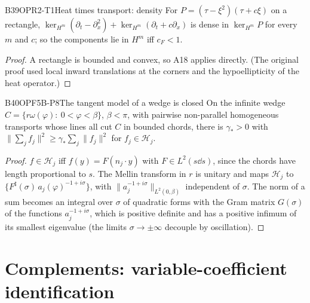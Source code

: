 \begin{dimcard}{B39}{OPR2-T1}{Heat times transport: density}{\pw}{}
For $P=(\tau-\xi^2)(\tau+c\xi)$ on a rectangle, $\ker_{H^m}(\partial_t-\partial_x^2)+\ker_{H^m}(\partial_t+c\partial_x)$ is dense in $\ker_{H^m}P$ for every $m$ and $c$; so the components lie in $H^m$ iff $c_F<1$.
\end{dimcard}
\begin{proof}
A rectangle is bounded and convex, so A18 applies directly. (The original proof used local inward translations at the corners and the hypoellipticity of the heat operator.)
\end{proof}

\begin{dimcard}{B40}{OPF5B-P8}{The tangent model of a wedge is closed}{\pw}{}
On the infinite wedge $C=\{r\omega(\varphi):\ 0<\varphi<\beta\}$, $\beta<\pi$, with pairwise non-parallel homogeneous transports whose lines all cut $C$ in bounded chords, there is $\gamma_*>0$ with $\|\sum_jf_j\|^2\ge\gamma_*\sum_j\|f_j\|^2$ for $f_j\in\mathcal H_j$.
\end{dimcard}
\begin{proof}
$f\in\mathcal H_j$ iff $f(y)=F(n_j\cdot y)$ with $F\in L^2(s\dd s)$, since the chords have length proportional to $s$.
The Mellin transform in $r$ is unitary and maps $\mathcal H_j$ to $\{F^\sharp(\sigma)\,a_j(\varphi)^{-1+i\sigma}\}$, with $\|a_j^{-1+i\sigma}\|_{L^2(0,\beta)}$ independent of $\sigma$.
The norm of a sum becomes an integral over $\sigma$ of quadratic forms with the Gram matrix $G(\sigma)$ of the functions $a_j^{-1+i\sigma}$, which is positive definite and has a positive infimum of its smallest eigenvalue (the limits $\sigma\to\pm\infty$ decouple by oscillation).
\end{proof}

\section{Complements: variable-coefficient identification}

